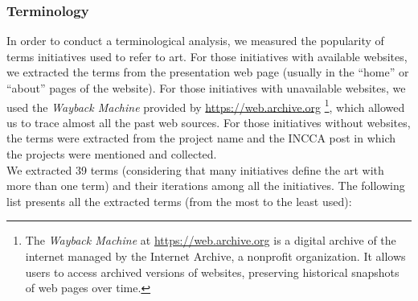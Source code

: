 \subsubsection{Terminology}
In order to conduct a terminological analysis, we measured the popularity of terms initiatives used to refer to art. For those initiatives with available websites, we extracted the terms from the presentation web page (usually in the ``home'' or ``about'' pages of the website). For those initiatives with unavailable websites, we used the \textit{Wayback Machine} provided by \url{https://web.archive.org} \footnote{The \textit{Wayback Machine} at \url{https://web.archive.org} is a digital archive of the internet managed by the Internet Archive, a nonprofit organization. It allows users to access archived versions of websites, preserving historical snapshots of web pages over time.}, which allowed us to trace almost all the past web sources. For those initiatives without websites, the terms were extracted from the project name and the INCCA post in which the projects were mentioned and collected.\\
We extracted 39 terms (considering that many initiatives define the art with more than one term) and their iterations among all the initiatives. The following list presents all the extracted terms (from the most to the least used):
